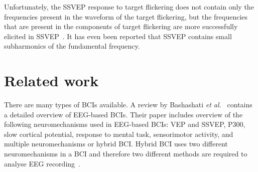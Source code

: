 Unfortunately, the \gls{SSVEP} response to \gls{target} \gls{flickering} does not contain only the frequencies present in the waveform of the \gls{target} \gls{flickering}, but the frequencies that are present in the components of \gls{target} \gls{flickering} are more successfully elicited in \gls{SSVEP}~\cite{square_sine}. It has even been reported that \gls{SSVEP} contains small subharmonics of the fundamental frequency.

\section{Related work}

There are many types of \glspl{BCI} available. A review by Bashashati \textit{et al.}~\cite{bci_comparison} contains a detailed overview of \gls{EEG}-based \glspl{BCI}. Their paper includes overview of the following neuromechanisms used in \gls{EEG}-based \glspl{BCI}: \gls{VEP} and \gls{SSVEP}, P300, slow cortical potential, response to mental task, sensorimotor activity, and multiple neuromechanisms or hybrid \gls{BCI}. Hybrid \gls{BCI} uses two different neuromechanisms in a \gls{BCI} and therefore two different methods are required to analyse \gls{EEG} recording~\cite{hybrid_bci, hybrid_bci2}. %

